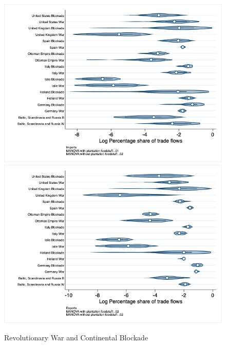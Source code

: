 \documentclass[12pt,a4paper,notitlepage,english]{article}
\begin{document}
\begin{figure}
\centering
\caption{Revolutionary War and Continental Blockade}
\label{rev_block_nat_distr_pays7}
\includegraphics[scale=.4]{rev_block_nat_distr_Ipays7}
\includegraphics[scale=.4]{rev_block_nat_distr_Xpays7}
\end{figure}
\end{document}

